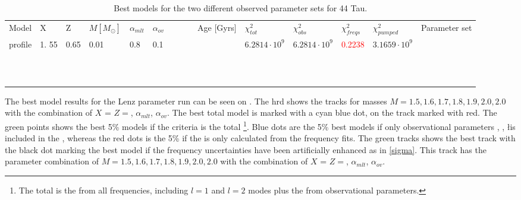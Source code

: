 \begin{table}
	\caption{Best models for the two different observed parameter sets for 44 Tau. }
	\label{bestmodels}
	
	\begin{tabular}{lllllllllllllll}
		Model & X & Z & $M[M_\odot]$ & $\alpha_{mlt}$ & $\alpha_{ov}$ & \teff  & \logg  & \lum & Age [Gyrs] & $\chi_{tot}^2$ &$\chi_{obs}^2$ & $\chi_{freqs}^2$ & $\chi_{pumped}^2$ & Parameter set\\
		profile &1. 55 & 0.65  & 0.01  & 0.8  & 0.1  &  &  &  &  &  $6.2814 \cdot 10^{9}$ &  $6.2814 \cdot 10^{9}$ & \textcolor{red}{0.2238} & $3.1659 \cdot 10^{9}$ &  \citet{lenz2010delta}\\
		&  &  &  &  &  &  &  &  &  &  \\
		&  &  &  &  &  &  &  &  &  &  \\
		&  &  &  &  &  &  &  &  &  &  \\
		&  &  &  &  &  &  &  &  &  &  \\
		&  &  &  &  &  &  &  &  &  &  \\
		&  &  &  &  &  &  &  &  &  &  \\
		&  &  &  &  &  &  &  &  &  &  \\
		&  &  &  &  &  &  &  &  &  &  \\
		&  &  &  &  &  &  &  &  &  &  \\
		&  &  &  &  &  &  &  &  &  &  \\
		&  &  &  &  &  &  &  &  &  &  \\
	\end{tabular}
\end{table}
The best model results for the Lenz parameter run can be seen on . The hrd shows the tracks for masses $M = 1.5,1.6,1.7,1.8,1.9,2.0,2.0$ with the combination of $X$ = $Z=$, $\alpha_{mlt}$, $\alpha_{ov}$. The best total model is marked with a cyan blue dot, on the track marked with red. The green points shows the best 5\% models if the criteria is the total \chis\footnote{The total \chis is the \chis from all frequencies, including $l=1$ and $l=2$ modes plus the \chis from observational parameters.}. Blue dots are the 5\% best models if only observational parameters \logg, \teff, \l is included in the \chis, whereas the red dots is the 5\% if the \chis is only calculated from the frequency fits. The green tracks shows the best track with the black dot marking the best model if the frequency uncertainties have been artificially enhanced as in \eqref{sigma}. This track has the parameter combination of $M = 1.5,1.6,1.7,1.8,1.9,2.0,2.0$ with the combination of $X$ = $Z=$, $\alpha_{mlt}$, $\alpha_{ov}$. 

